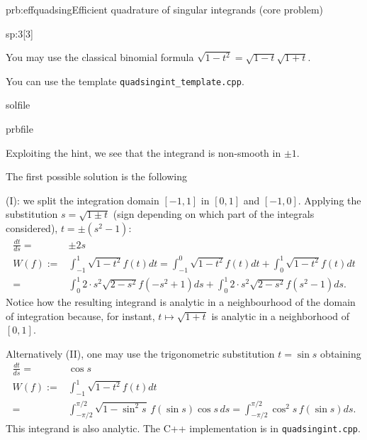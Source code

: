 \begin{samproblem}{prb:effquadsing}{Efficient quadrature of singular integrands (core problem)}
\begin{subproblem}{sp:3}[3]
 \begin{samhint}
   You may use the classical binomial formula
   $\sqrt{1 - t^2} = \sqrt{1 - t} \sqrt{1 + t}$.
 \end{samhint}
 
 \begin{samhint}
  You can use the template \verb|quadsingint_template.cpp|.
 \end{samhint}

  \begin{samwriteprbpart}{solfile}
    \begin{writeverbatim}{prbfile}
      \begin{samsolution}
        Exploiting the hint, we see that the integrand is non-smooth in $\pm 1$. 
   
        The first possible solution is the following 

        (I): we split the integration domain $[-1,1]$ in $[0,1]$ and $[-1,0]$. 
             Applying the substitution $s = \sqrt{1 \pm t}$ (sign depending on which part of the integrals considered), $t = \pm(s^2 - 1)$:
        \begin{align*}
          \frac{dt}{ds} =& \pm2s \\
          W(f) :=& \int_{-1}^1 \sqrt{1 - t^2} f(t) dt = \int_{-1}^0 \sqrt{1 - t^2} f(t) dt + \int_0^1 \sqrt{1 - t^2} f(t) dt \\
          =& \int_0^{1} 2 \cdot s^2 \sqrt{2 - s^2} f(-s^2+1) ds + \int_0^{1} 2 \cdot s^2 \sqrt{2 - s^2} f(s^2-1) ds.
        \end{align*}
        Notice how the resulting integrand is analytic in a neighbourhood of the domain
        of integration because, for instant, {$t\mapsto \sqrt{1+t}$} is analytic in a neighborhood of $[0,1]$. 
   
        Alternatively (II), one may use the trigonometric substitution $t = \sin s$ obtaining
        \begin{align*}
          \frac{dt}{ds} =& \cos s \\
          W(f) :=& \int_{-1}^1 \sqrt{1 - t^2} f(t) dt \\
          =& \int_{-\pi / 2}^{\pi / 2} \sqrt{1 - \sin^2\! s}\, f(\sin s) \cos s\,ds = \int_{-\pi / 2}^{\pi / 2} \cos^2\! s \, f(\sin s) ds.
        \end{align*}
        This integrand is also analytic.
        The C++ implementation is in \verb|quadsingint.cpp|.
      \end{samsolution}
    \end{writeverbatim}
  \end{samwriteprbpart}


\end{subproblem}
\end{samproblem}
